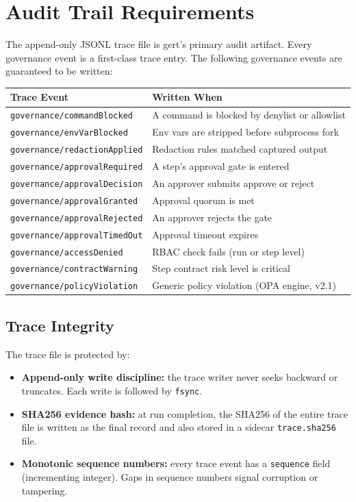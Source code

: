 \section{Audit Trail Requirements}

The append-only JSONL trace file is gert's primary audit artifact. Every governance event
is a first-class trace entry. The following governance events are guaranteed to be written:

\begin{center}
\begin{tabular}{ll}
\textbf{Trace Event} & \textbf{Written When} \\
\hline
\texttt{governance/commandBlocked} & A command is blocked by denylist or allowlist \\
\texttt{governance/envVarBlocked} & Env vars are stripped before subprocess fork \\
\texttt{governance/redactionApplied} & Redaction rules matched captured output \\
\texttt{governance/approvalRequired} & A step's approval gate is entered \\
\texttt{governance/approvalDecision} & An approver submits approve or reject \\
\texttt{governance/approvalGranted} & Approval quorum is met \\
\texttt{governance/approvalRejected} & An approver rejects the gate \\
\texttt{governance/approvalTimedOut} & Approval timeout expires \\
\texttt{governance/accessDenied} & RBAC check fails (run or step level) \\
\texttt{governance/contractWarning} & Step contract risk level is critical \\
\texttt{governance/policyViolation} & Generic policy violation (OPA engine, v2.1) \\
\end{tabular}
\end{center}

\subsection{Trace Integrity}

The trace file is protected by:
\begin{itemize}
  \item \textbf{Append-only write discipline:} the trace writer never seeks backward or
        truncates. Each write is followed by \texttt{fsync}.
  \item \textbf{SHA256 evidence hash:} at run completion, the SHA256 of the entire trace
        file is written as the final record and also stored in a sidecar
        \texttt{trace.sha256} file.
  \item \textbf{Monotonic sequence numbers:} every trace event has a \texttt{sequence} field
        (incrementing integer). Gaps in sequence numbers signal corruption or tampering.
\end{itemize}

